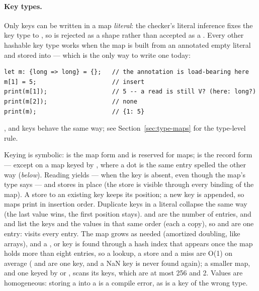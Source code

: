\paragraph{Key types.} Only  keys can be written in a map
\emph{literal}: the checker's literal inference fixes the key type to
, so  is rejected as a shape rather than
accepted as a . Every other hashable key type
works when the map is built from an annotated empty literal and stored
into --- which is the only way to write one today:

\begin{lstlisting}
let m: {long => long} = {};   // the annotation is load-bearing here
m[1] = 5;                     // insert
print(m[1]);                  // 5 -- a read is still V? (here: long?)
print(m[2]);                  // none
print(m);                     // {1: 5}
\end{lstlisting}

\noindent {},  and  keys behave the same
way; see Section~\ref{sec:type-maps} for the type-level rule.

\noindent Keying is symbolic:  is the map form and is reserved
for maps;  is the record form --- except on a map keyed by
, where a dot is the same entry spelled the other way
(\emph{below}). Reading
 yields  ---  when the key is absent,
even though the map's type says  --- and  stores in
place (the store is visible through every binding of the map). A store
to an existing key keeps its position; a new key is appended, so maps
print in insertion order. Duplicate keys in a literal collapse the same
way (the last value wins, the first position stays).  and
 are the number of entries, and  and
 list the keys and the values in that same order (each a
copy), so  and  are one entry:
 visits every entry. The
map grows as needed (amortized doubling, like arrays), and a ,  or  key is found through a hash index that appears once the map holds more than eight entries, so a lookup, a store and a miss are O(1) on average ( and  are one key, and a NaN key is never found again); a smaller map, and one keyed by  or , scans its keys, which are at most 256 and 2. Values are homogeneous: storing a  into a
 is a compile error, as is a key of the wrong type.

